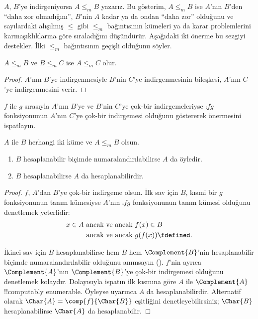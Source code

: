 \documentclass[../../../include/open-logic-section]{subfiles}
\begin{document}

$A$, $B$'ye indirgeniyorsa $A\leq_m B$ yazarız. Bu gösterim,
$A\leq_m B$ ise $A$'nın $B$'den ``daha zor olmadığını'', $B$'nin $A$ kadar
ya da ondan ``daha zor'' olduğunu ve sayılardaki alışılmış $\leq$ gibi
$\leq_m$ bağıntısının kümeleri ya da karar problemlerini karmaşıklıklarına
göre sıraladığını düşündürür. Aşağıdaki iki önerme bu sezgiyi destekler.
İlki $\leq_m$ bağıntısının geçişli olduğunu söyler.

\begin{prop}
$A\leq_m B$ ve $B\leq_m C$ ise $A\leq_m C$ olur.
\end{prop}

\begin{proof}
$A$'nın $B$'ye indirgenmesiyle $B$'nin $C$'ye indirgenmesinin bileşkesi,
$A$'nın $C$'ye indirgenmesini verir.
\end{proof}

\begin{prob}
$f$ ile $g$ sırasıyla $A$'nın $B$'ye ve $B$'nin $C$'ye çok-bir
indirgemeleriyse $\comp{f}{g}$ fonksiyonunun $A$'nın $C$'ye çok-bir
indirgemesi olduğunu göstererek  önermesini ispatlayın.
\end{prob}

\begin{prop}
$A$ ile $B$ herhangi iki küme ve $A\leq_m B$ olsun.
\begin{enumerate}
\item $B$ hesaplanabilir biçimde numaralandırılabilirse $A$ da öyledir.
\item $B$ hesaplanabilirse $A$ da hesaplanabilirdir.
\end{enumerate}
\end{prop}

\begin{proof}
$f$, $A$'dan $B$'ye çok-bir indirgeme olsun. İlk sav için $B$, kısmi bir
$g$ fonksiyonunun tanım kümesiyse $A$'nın $\comp{f}{g}$ fonksiyonunun tanım
kümesi olduğunu denetlemek yeterlidir:
\begin{align*}
  x\in A & \text{ ancak ve ancak } f(x)\in B\\
  & \text{ ancak ve ancak } g(f(x))\fdefined.
\end{align*}

İkinci sav için $B$ hesaplanabilirse hem $B$ hem $\Complement{B}$'nin
hesaplanabilir biçimde numaralandırılabilir olduğunu anımsayın
(). $f$'nin ayrıca $\Complement{A}$'nın
$\Complement{B}$'ye çok-bir indirgemesi olduğunu denetlemek kolaydır.
Dolayısıyla ispatın ilk kısmına göre $A$ ile $\Complement{A}$
!!{computably enumerable}. Öyleyse  uyarınca $A$ da
hesaplanabilirdir. Alternatif olarak
$\Char{A}=\comp{f}{\Char{B}}$ eşitliğini denetleyebilirsiniz; $\Char{B}$
hesaplanabilirse $\Char{A}$ da hesaplanabilir.
\end{proof}
\end{document}
